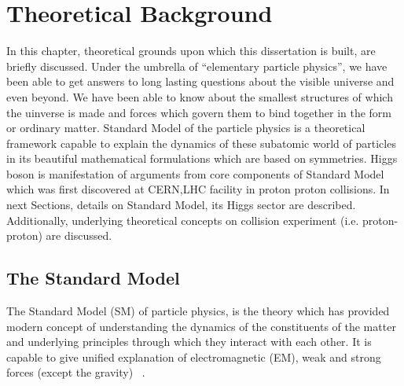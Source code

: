 \chapter{Theoretical Background}\label{Chapter1} %
In this chapter, theoretical grounds upon which this dissertation is built, are briefly discussed.  
Under the umbrella of ``elementary particle physics'', we have been able to get answers to long lasting questions about the visible universe and even beyond.  
We have been able to know about the smallest structures of which the uinverse is made and forces which govern them to bind together in the form or ordinary matter.
Standard Model of the particle physics is a theoretical framework capable to explain the dynamics of these subatomic world of particles in its beautiful mathematical formulations which are based on symmetries.
Higgs boson is manifestation of arguments from core components of Standard Model which was first discovered at CERN,LHC facility in proton proton collisions.  
In next Sections, details on Standard Model, its Higgs sector are described. Additionally, underlying theoretical concepts on collision experiment (i.e. proton-proton) are discussed. %
\section{The Standard Model}\label{chapter1_sec1_SM}
The Standard Model (SM) of particle physics, is the theory which has provided modern concept of understanding the dynamics of the constituents of the matter and underlying principles through which they interact with each other. 
It is capable to give unified explanation of electromagnetic (EM), weak and strong forces (except the gravity) ~\cite{Reference1}. 
